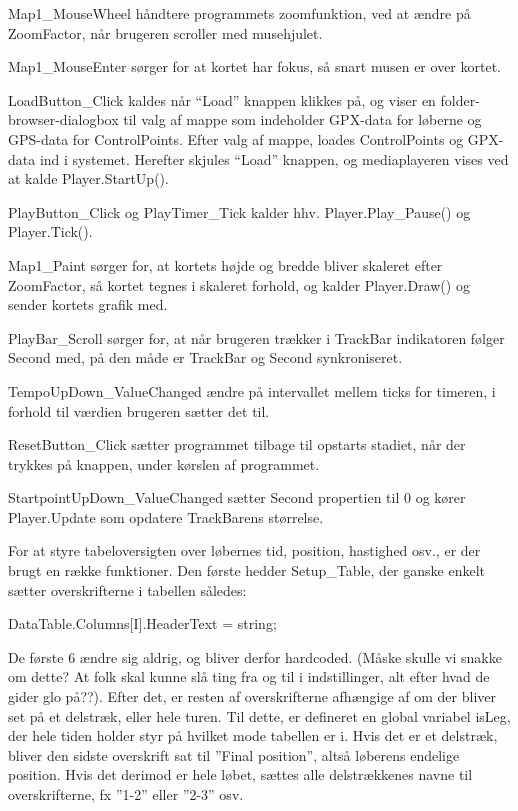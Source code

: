 Map1\_MouseWheel håndtere programmets zoomfunktion, ved at ændre på ZoomFactor, når brugeren scroller med musehjulet.

Map1\_MouseEnter sørger for at kortet har fokus, så snart musen er over kortet. 

LoadButton\_Click kaldes når “Load” knappen klikkes på, og viser en folder-browser-dialogbox til valg af mappe som indeholder GPX-data for løberne og GPS-data for ControlPoints. Efter valg af mappe, loades ControlPoints og GPX-data ind i systemet. Herefter skjules “Load” knappen, og mediaplayeren vises ved at kalde Player.StartUp().

PlayButton\_Click og PlayTimer\_Tick kalder hhv. Player.Play\_Pause() og Player.Tick().

Map1\_Paint sørger for, at kortets højde og bredde bliver skaleret efter ZoomFactor, så kortet tegnes i skaleret forhold, og kalder Player.Draw() og sender kortets grafik med.

PlayBar\_Scroll sørger for, at når brugeren trækker i TrackBar indikatoren følger Second med, på den måde er TrackBar og Second synkroniseret.

TempoUpDown\_ValueChanged ændre på intervallet mellem ticks for timeren, i forhold til værdien brugeren sætter det til. 

ResetButton\_Click sætter programmet tilbage til opstarts stadiet, når der trykkes på knappen, under kørslen af programmet. 

StartpointUpDown\_ValueChanged sætter Second propertien til 0 og kører Player.Update som opdatere TrackBarens størrelse.

For at styre tabeloversigten over løbernes tid, position, hastighed osv., er der brugt en række funktioner. 
Den første hedder Setup\_Table, der ganske enkelt sætter overskrifterne i tabellen således:

DataTable.Columns[I].HeaderText = string;

De første 6 ændre sig aldrig, og bliver derfor hardcoded. (Måske skulle vi snakke om dette? At folk skal kunne slå ting fra og til i indstillinger, alt efter hvad de gider glo på??). Efter det, er resten af overskrifterne afhængige af om der bliver set på et delstræk, eller hele turen.  Til dette, er defineret en global variabel isLeg, der hele tiden holder styr på hvilket mode tabellen er i. Hvis det er et delstræk, bliver den sidste overskrift sat til ”Final position”, altså løberens endelige position. Hvis det derimod er hele løbet, sættes alle delstrækkenes navne til overskrifterne, fx ”1-2” eller ”2-3” osv. 

